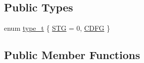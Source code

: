 \subsection*{Public Types}
\begin{DoxyCompactItemize}
\item 
enum \hyperlink{classreg__binding_a925bc3c7414dec8215c074821438f67d}{type\+\_\+t} \{ \hyperlink{classreg__binding_a925bc3c7414dec8215c074821438f67dadb264c2d0f6020d5e2e39f8ef3e56b4a}{S\+TG} = 0, 
\hyperlink{classreg__binding_a925bc3c7414dec8215c074821438f67da2fc6dfb888709b3c6611995ac85d26cc}{C\+D\+FG}
 \}
\end{DoxyCompactItemize}
\subsection*{Public Member Functions}
